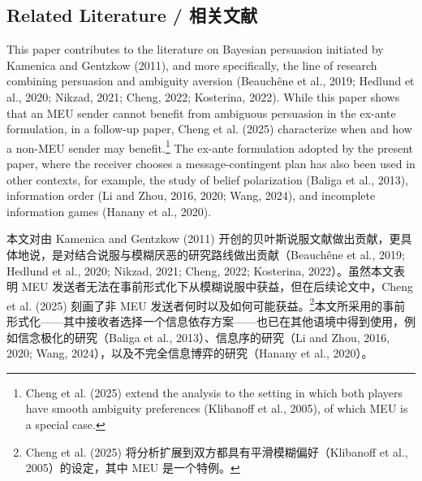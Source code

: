 \documentclass[12pt,a4paper]{article}
\theoremstyle{definition}
\theoremstyle{remark}
\newenvironment{original}{%
    \par\medskip\noindent%
    \begin{tcolorbox}[%
        colback=white,%
        colframe=black!50,%
        title=\textbf{Original English},%
        fonttitle=\small\bfseries,%
        left=0pt, right=0pt, top=2pt, bottom=2pt,%
        boxrule=0.5pt,%
        arc=0pt,%
        outer arc=0pt%
    ]%
    \small%
}{%
    \end{tcolorbox}%
}
\newenvironment{translation}{%
    \par\smallskip\noindent%
    \begin{tcolorbox}[%
        colback=blue!3!white,%
        colframe=blue!40!black,%
        title=\textbf{中文翻译},%
        fonttitle=\small\bfseries,%
        left=0pt, right=0pt, top=2pt, bottom=2pt,%
        boxrule=0.5pt,%
        arc=0pt,%
        outer arc=0pt%
    ]%
    \small\color{blue!60!black}%
}{%
    \end{tcolorbox}\medskip%
}
\begin{document}
\subsection{Related Literature / 相关文献}

\begin{original}
This paper contributes to the literature on Bayesian persuasion initiated by Kamenica and Gentzkow (2011), and more specifically, the line of research combining persuasion and ambiguity aversion (Beauch\^{e}ne et al., 2019; Hedlund et al., 2020; Nikzad, 2021; Cheng, 2022; Kosterina, 2022). While this paper shows that an MEU sender cannot benefit from ambiguous persuasion in the ex-ante formulation, in a follow-up paper, Cheng et al. (2025) characterize when and how a non-MEU sender may benefit.\footnote{Cheng et al. (2025) extend the analysis to the setting in which both players have smooth ambiguity preferences (Klibanoff et al., 2005), of which MEU is a special case.} The ex-ante formulation adopted by the present paper, where the receiver chooses a message-contingent plan has also been used in other contexts, for example, the study of belief polarization (Baliga et al., 2013), information order (Li and Zhou, 2016, 2020; Wang, 2024), and incomplete information games (Hanany et al., 2020).
\end{original}
\begin{translation}
本文对由 Kamenica and Gentzkow (2011) 开创的贝叶斯说服文献做出贡献，更具体地说，是对结合说服与模糊厌恶的研究路线做出贡献（Beauch\^{e}ne et al., 2019; Hedlund et al., 2020; Nikzad, 2021; Cheng, 2022; Kosterina, 2022）。虽然本文表明 MEU 发送者无法在事前形式化下从模糊说服中获益，但在后续论文中，Cheng et al. (2025) 刻画了非 MEU 发送者何时以及如何可能获益。\footnote{Cheng et al. (2025) 将分析扩展到双方都具有平滑模糊偏好（Klibanoff et al., 2005）的设定，其中 MEU 是一个特例。}本文所采用的事前形式化——其中接收者选择一个信息依存方案——也已在其他语境中得到使用，例如信念极化的研究（Baliga et al., 2013）、信息序的研究（Li and Zhou, 2016, 2020; Wang, 2024），以及不完全信息博弈的研究（Hanany et al., 2020）。
\end{translation}
\end{document}
